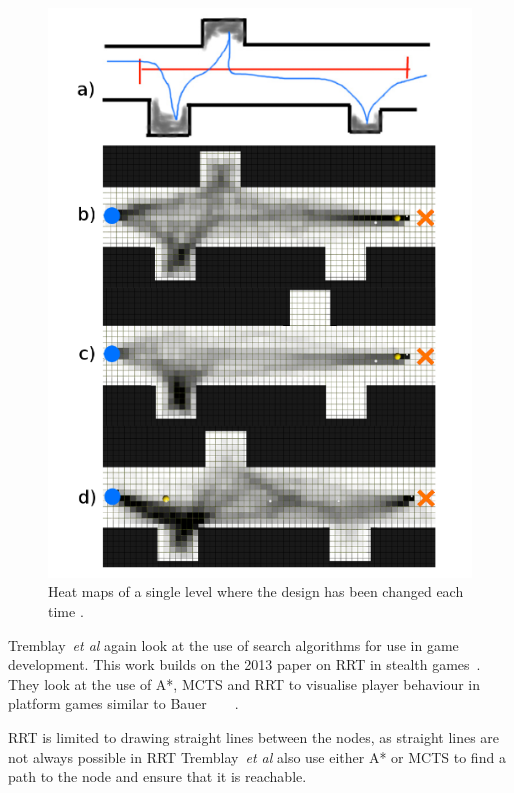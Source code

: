 \documentclass[journal]{IEEEtran}
\begin{document}
\begin{figure}[h]
	\includegraphics[width=1.0\linewidth]{TremblayHeatMap.png}
	\caption{ Heat maps of a single level where the design has been changed each time \cite{Tremblay2013}.}
	\label{TremblayHeatMap}
\end{figure} 

Tremblay~\textit{et al} again look at the use of search algorithms for use in game development. This work builds on the 2013 paper on RRT in stealth games~\cite{Tremblay2014}. They look at the use of A*, MCTS and RRT to visualise player behaviour in platform games similar to Bauer ~\cite{Tremblay2014}  ~\cite{bauer2012} . 

RRT is limited to drawing straight lines between the nodes, as straight lines are not always possible in RRT  Tremblay~\textit{et al} also use either A* or MCTS to find a path to the node and ensure that it is reachable.

\end{document}

